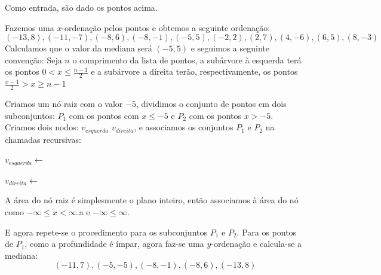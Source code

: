 Como entrada, são dado os pontos acima.

Fazemos uma $x$-ordenação pelos pontos e obtemos a seguinte ordenação:
\[
    (-13,8), (-11,-7), (-8,6), (-8,-1), (-5,5), (-2, 2), (2,7), (4,-6),(6,5),(8,-3)
\]
Calculamos que o valor da mediana será $(-5,5)$ e seguimos a seguinte convenção:
Seja $n$ o comprimento da lista de pontos, a subárvore à esquerda terá os pontos $0 < x \leq 
\frac{n-1}{2}$ e a subárvore a direita terão, respectivamente, os pontos $ \frac{x-1}{2} > x \geq n -1$

Criamos um nó raiz com o valor $-5$, dividimos o conjunto de pontos em dois subconjuntos: $P_1$ 
com os pontos com $x \leq -5$ e $P_2$ com os pontos $x > -5$.
Criamos dois nodos: $v_{esquerda}$ $v_{direita}$, e associamos os conjuntos $P_1$ e $P_2$ na chamadas
recursivas: 

$v_{esquerda} \leftarrow $ 

$v_{direita} \leftarrow $ 

A área do nó raiz é simplesmente o plano inteiro, então associamos à área do nó como 
$ -\infty \leq x < \infty$.a e $ -\infty \leq \infty$.


E agora repete-se o procedimento para os subconjuntos $P_1$ e $P_2$.
Para os pontos de $P_1$, como a profundidade é ímpar, agora faz-se uma $y$-ordenação e calcula-se a mediana:
\[
    (-11,7), (-5,-5), (-8,-1), (-8,6), (-13,8)
\]

